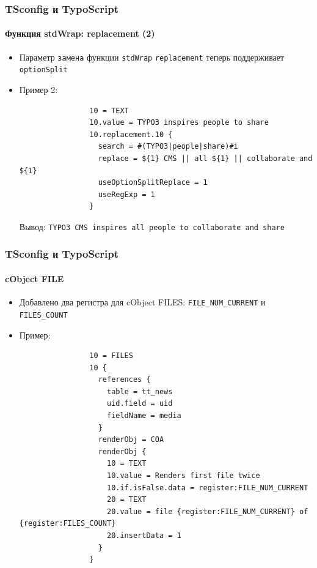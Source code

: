 
\begin{frame}[fragile]
	\frametitle{TSconfig и TypoScript}
	\framesubtitle{Функция stdWrap: replacement (2)}

	\begin{itemize}
		\item Параметр \texttt{замена} функции \texttt{stdWrap} \texttt{replacement}\newline
			теперь поддерживает \texttt{optionSplit}

		\item Пример 2:

			\begin{lstlisting}
				10 = TEXT
				10.value = TYPO3 inspires people to share
				10.replacement.10 {
				  search = #(TYPO3|people|share)#i
				  replace = ${1} CMS || all ${1} || collaborate and ${1}
				  useOptionSplitReplace = 1
				  useRegExp = 1
				}
			\end{lstlisting}

			Вывод:\newline
				\texttt{TYPO3 CMS inspires all people to collaborate and share}

	\end{itemize}

\end{frame}


\begin{frame}[fragile]
	\frametitle{TSconfig и TypoScript}
	\framesubtitle{cObject FILE}

	\begin{itemize}
		\item Добавлено два регистра для cObject FILES:\newline
			\texttt{FILE\_NUM\_CURRENT} и \texttt{FILES\_COUNT}

		\item Пример:

			\lstset{
				basicstyle=\tiny\ttfamily
			}

			\begin{lstlisting}
				10 = FILES
				10 {
				  references {
				    table = tt_news
				    uid.field = uid
				    fieldName = media
				  }
				  renderObj = COA
				  renderObj {
				    10 = TEXT
				    10.value = Renders first file twice
				    10.if.isFalse.data = register:FILE_NUM_CURRENT
				    20 = TEXT
				    20.value = file {register:FILE_NUM_CURRENT} of {register:FILES_COUNT}
				    20.insertData = 1
				  }
				}
			\end{lstlisting}

	\end{itemize}

\end{frame}

